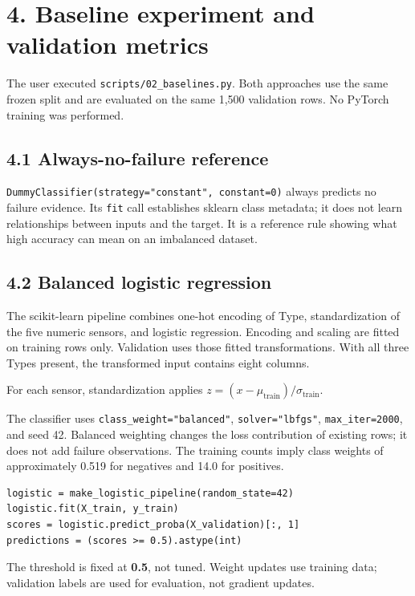 \documentclass[11pt,a4paper]{article}
\newcommand{\filepath}[1]{\nolinkurl{#1}}
\newcommand{\pagetitle}[1]{\section*{#1}}
\begin{document}
\newpage
\pagetitle{4. Baseline experiment and validation metrics}
The user executed \filepath{scripts/02_baselines.py}. Both approaches use
the same frozen split and are evaluated on the same 1,500 validation rows.
No PyTorch training was performed.

\subsection*{4.1 Always-no-failure reference}
\texttt{DummyClassifier(strategy="constant", constant=0)} always predicts
no failure evidence. Its \texttt{fit} call establishes sklearn class metadata;
it does not learn relationships between inputs and the target. It is a
reference rule showing what high accuracy can mean on an imbalanced dataset.

\subsection*{4.2 Balanced logistic regression}
The scikit-learn pipeline combines one-hot encoding of Type, standardization
of the five numeric sensors, and logistic regression. Encoding and scaling
are fitted on training rows only. Validation uses those fitted transformations.
With all three Types present, the transformed input contains eight columns.

For each sensor, standardization applies
\(z=(x-\mu_{\mathrm{train}})/\sigma_{\mathrm{train}}\).

The classifier uses
\texttt{class\_weight="balanced"}, \texttt{solver="lbfgs"},
\texttt{max\_iter=2000}, and seed 42. Balanced weighting changes the loss
contribution of existing rows; it does not add failure observations.
The training counts imply class weights of approximately 0.519 for negatives
and 14.0 for positives.

\begin{verbatim}
logistic = make_logistic_pipeline(random_state=42)
logistic.fit(X_train, y_train)
scores = logistic.predict_proba(X_validation)[:, 1]
predictions = (scores >= 0.5).astype(int)
\end{verbatim}

The threshold is fixed at \textbf{0.5}, not tuned. Weight updates use training
data; validation labels are used for evaluation, not gradient updates.
\end{document}
